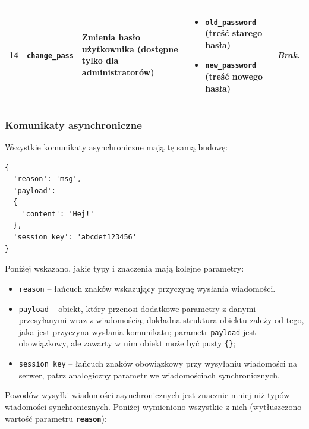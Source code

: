 {\begin{longtable}{ | l | l | l | l | l | }
\hline

\parbox[t]{0.8cm}{
	14

} & \parbox[t]{1.7cm}{\strut
	\texttt{change\_pass}

\strut} & \parbox{4.1cm}{
	Zmienia hasło użytkownika (dostępne tylko dla administratorów)

} & \parbox{3.9cm}{
	\begin{itemize}
		\item \texttt{old\_password} (treść starego hasła)
		\item \texttt{new\_password} (treść nowego hasła)
	\end{itemize}


} & \parbox{3.9cm}{
	\textit{Brak.}
} \\

\hline

\end{longtable}
}

\subsubsection{Komunikaty asynchroniczne}
Wszystkie komunikaty asynchroniczne mają tę samą budowę:

\begin{lstlisting}
{
  'reason': 'msg',
  'payload':
  {
    'content': 'Hej!'
  },
  'session_key': 'abcdef123456'
}
\end{lstlisting}

Poniżej wskazano, jakie typy i znaczenia mają kolejne parametry:
\begin{itemize}
	\item \texttt{reason} -- łańcuch znaków wskazujący przyczynę wysłania wiadomości.

	\item \texttt{payload} -- obiekt, który przenosi dodatkowe parametry z danymi
	przesyłanymi wraz z wiadomością;
	dokładna struktura obiektu zależy od tego, jaka jest przyczyna wysłania
	komunikatu; parametr \texttt{payload} jest obowiązkowy, ale
	zawarty w nim obiekt może być pusty \texttt{\{\}};

	\item \texttt{session\_key} -- łańcuch znaków obowiązkowy przy wysyłaniu
	wiadomości na serwer, patrz analogiczny parametr we wiadomościach synchronicznych.

\end{itemize}

Powodów wysyłki wiadomości asynchronicznych jest znacznie mniej niż typów wiadomości
synchronicznych. Poniżej wymieniono wszystkie z nich (wytłuszczono wartość
parametru \textbf{\texttt{reason}}):

